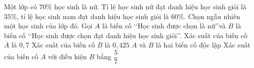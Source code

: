 \begin{ex}%
	Một lớp có $70\%$ học sinh là nữ.  Tỉ lệ học sinh nữ đạt danh hiệu học sinh giỏi là $35\%$, tỉ lệ học sinh nam đạt danh hiệu học sinh giỏi là $60\%$. Chọn ngẫu nhiên một học sinh của lớp đó. Gọi $A$ là biến cố \lq \lq Học sinh được chọn là nữ\rq \rq và $B$ là biến cố \lq \lq Học sinh được chọn đạt danh hiệu học sinh giỏi\rq \rq.
	\choiceTF 
		{Xác suất  của biến cố $\overline{A}$ là $0{,}7$}
		{\True Xác suất  của biến cố $B$ là $0{,}425$}
		{$A$ và  $B$ là hai biến cố độc lập}
		{Xác suất của biến  cố $A$ với điều kiện $B$ bằng $\dfrac{5}{7}$}
\end{ex}

